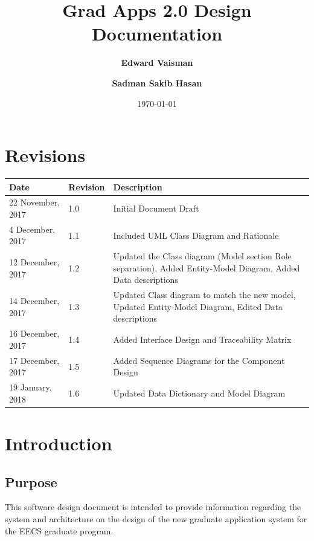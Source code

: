 \documentclass[fontsize=12pt,paper=letter,twoside]{scrartcl}
\author{\textbf{Edward Vaisman}
\and \textbf{Sadman Sakib Hasan}
}
\date{\today} %
\begin{document}
\title{Grad Apps 2.0 Design Documentation}
\maketitle

\newpage

\section*{Revisions}

\begin{tabular}{|l|l|p{3in}|}
\hline
Date & Revision & Description \\ 
\hline
22 November, 2017
& 1.0
& Initial Document Draft \\
\hline
4 December, 2017
& 1.1
& Included UML Class Diagram and Rationale \\
\hline
12 December, 2017
& 1.2
& Updated the Class diagram (Model section Role separation), Added Entity-Model Diagram, Added Data descriptions \\
\hline
14 December, 2017
& 1.3
& Updated Class diagram to match the new model, Updated Entity-Model Diagram, Edited Data descriptions \\
\hline
16 December, 2017
& 1.4
& Added Interface Design and Traceability Matrix \\
\hline
17 December, 2017
& 1.5
& Added Sequence Diagrams for the Component Design \\
\hline
19 January, 2018
& 1.6
& Updated Data Dictionary and Model Diagram \\
\hline
\end{tabular}

\newpage

\tableofcontents
\listoffigures
\listoftables
\newpage



\clearpage
\section{Introduction}

\subsection{Purpose}

This software design document is intended to provide information regarding the system and architecture on the design of the new graduate application system for the EECS graduate program.
\end{document}
